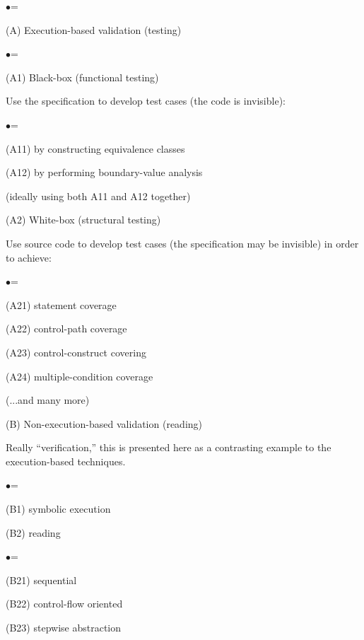 \begin{list}{$\bullet$}{\leftmargin=}

\item[(A)] Execution-based validation (testing)

\begin{list}{$\bullet$}{\leftmargin=}

\item [(A1)] Black-box (functional testing)

Use the specification to develop test cases
(the code is invisible):
\begin{list}{$\bullet$}{\leftmargin=}
\item[(A11)] by constructing equivalence classes 
\item[(A12)] by performing boundary-value analysis

(ideally using both A11 and A12 together)
\end{list}

\item[(A2)] White-box (structural testing)

Use source code to develop test cases (the specification may be invisible)
in order to achieve:
\begin{list}{$\bullet$}{\leftmargin=}
\item[(A21)] statement coverage
\item[(A22)] control-path coverage
\item[(A23)] control-construct covering 
\item[(A24)] multiple-condition coverage

(...and many more)
\end{list}

\end{list}

\item [(B)] Non-execution-based validation (reading)

Really ``verification,'' this is presented here 
as a contrasting example to the execution-based techniques.

\begin{list}{$\bullet$}{\leftmargin=}
\item [(B1)] symbolic execution
\item [(B2)] reading

\begin{list}{$\bullet$}{\leftmargin=}
\item[(B21)] sequential
\item[(B22)] control-flow oriented
\item[(B23)] stepwise abstraction
\end{list}

\end{list}

\end{list}

